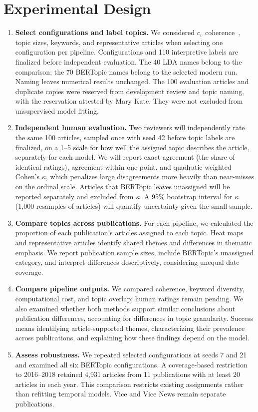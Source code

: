 \documentclass[conference]{IEEEtran}
\begin{document}
\section*{Experimental Design}
\begin{enumerate}
    \item \textbf{Select configurations and label topics.} We considered $c_v$ coherence~\cite{roder2015coherence}, topic sizes, keywords, and representative articles when selecting one configuration per pipeline. Configurations and 110 interpretive labels are finalized before independent evaluation. The 40 LDA names belong to the comparison; the 70 BERTopic names belong to the selected modern run. Naming leaves numerical results unchanged. The 100 evaluation articles and duplicate copies were reserved from development review and topic naming, with the reservation attested by Mary Kate. They were not excluded from unsupervised model fitting.
    \item \textbf{Independent human evaluation.} Two reviewers will independently rate the same 100 articles, sampled once with seed 42 before topic labels are finalized, on a 1--5 scale for how well the assigned topic describes the article, separately for each model. We will report exact agreement (the share of identical ratings), agreement within one point, and quadratic-weighted Cohen's $\kappa$, which penalizes large disagreements more heavily than near-misses on the ordinal scale. Articles that BERTopic leaves unassigned will be reported separately and excluded from $\kappa$. A 95\% bootstrap interval for $\kappa$ (1,000 resamples of articles) will quantify uncertainty given the small sample.
    \item \textbf{Compare topics across publications.} For each pipeline, we calculated the proportion of each publication's articles assigned to each topic. Heat maps and representative articles identify shared themes and differences in thematic emphasis. We report publication sample sizes, include BERTopic's unassigned category, and interpret differences descriptively, considering unequal date coverage.
    \item \textbf{Compare pipeline outputs.} We compared coherence, keyword diversity, computational cost, and topic overlap; human ratings remain pending. We also examined whether both methods support similar conclusions about publication differences, accounting for differences in topic granularity. Success means identifying article-supported themes, characterizing their prevalence across publications, and explaining how these findings depend on the model.
    \item \textbf{Assess robustness.} We repeated selected configurations at seeds 7 and 21 and examined all six BERTopic configurations. A coverage-based restriction to 2016--2018 retained 4,931 articles from 11 publications with at least 20 articles in each year. This comparison restricts existing assignments rather than refitting temporal models. Vice and Vice News remain separate publications.
\end{enumerate}
\end{document}
